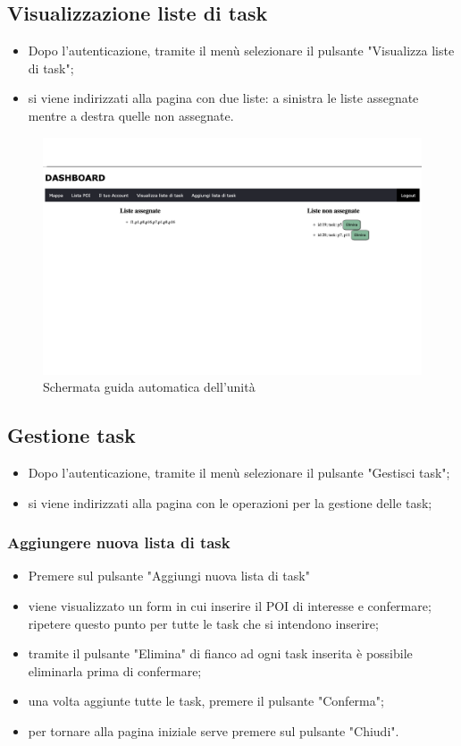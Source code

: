 \subsection{Visualizzazione liste di task}
\begin{itemize}
    \item Dopo l'autenticazione, tramite il menù selezionare il pulsante "Visualizza liste di task";
    \item si viene indirizzati alla pagina con due liste: a sinistra le liste assegnate mentre a destra quelle non assegnate.

    
\end{itemize}
\begin{figure}[H]
    \centering
    \includegraphics[scale=0.12]{res/images/task_manager.png}
    \caption{Schermata guida automatica dell'unità}
\end{figure}
\subsection{Gestione task}
\begin{itemize}
    \item Dopo l'autenticazione, tramite il menù selezionare il pulsante "Gestisci task";
    \item si viene indirizzati alla pagina con le operazioni per la gestione delle task;
\end{itemize}
\subsubsection{Aggiungere nuova lista di task}
\begin{itemize}
    \item Premere sul pulsante "Aggiungi nuova lista di task"
    \item viene visualizzato un form in cui inserire il POI di interesse e confermare; \\ripetere questo punto per tutte le task che si intendono inserire;
    \item tramite il pulsante "Elimina" di fianco ad ogni task inserita è possibile eliminarla prima di confermare;
    \item una volta aggiunte tutte le task, premere il pulsante "Conferma";
    \item per tornare alla pagina iniziale serve premere sul pulsante "Chiudi".
\end{itemize}

